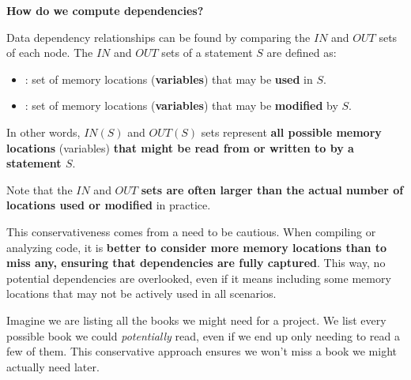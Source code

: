 \highspace
\begin{flushleft}
    \textcolor{Green3}{ \textbf{How do we compute dependencies?}}
\end{flushleft}
Data dependency relationships can be found by comparing the $IN$ and $OUT$ sets of each node. The $IN$ and $OUT$ sets of a statement $S$ are defined as:
\begin{itemize}
    \item {}: set of memory locations (\textbf{variables}) that may be \textbf{used} in $S$.
    \item {}: set of memory locations (\textbf{variables}) that may be \textbf{modified} by $S$.
\end{itemize}
In other words, $IN\left(S\right)$ and $OUT\left(S\right)$ sets represent \textbf{all possible memory locations} (variables) \textbf{that might be read from or written to by a statement $S$}.

\highspace
Note that the $IN$ and $OUT$ \textbf{sets are often larger than the actual number of locations used or modified} in practice.

\highspace
This conservativeness comes from a need to be cautious. When compiling or analyzing code, it is \textbf{better to consider more memory locations than to miss any, ensuring that dependencies are fully captured}. This way, no potential dependencies are overlooked, even if it means including some memory locations that may not be actively used in all scenarios.

\highspace
\begin{examplebox}
    Imagine we are listing all the books we might need for a project. We list every possible book we could \emph{potentially} read, even if we end up only needing to read a few of them. This conservative approach ensures we won't miss a book we might actually need later.
\end{examplebox}

